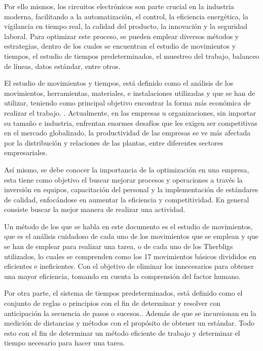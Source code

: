     
    Por ello mismos, los circuitos electrónicos son parte crucial en la industria moderna, facilitando a la automatización, el control, la eficiencia energética, la vigilancia en tiempo real, la calidad del producto, la innovación y la seguridad laboral. Para optimizar este proceso, se pueden emplear diversos métodos y estrategias, dentro de los cuales se encuentran el estudio de movimientos y tiempos, el estudio de tiempos predeterminados, el muestreo del trabajo, balanceo de líneas, datos estándar, entre otros.
    
    
    El estudio de movimientos y tiempos, está definido como el análisis de los movimientos, herramientas, materiales, e instalaciones utilizadas y que se han de utilizar, teniendo como principal objetivo encontrar la forma más económica de realizar el trabajo. \cite{RAE}. Actualmente, en las empresas u organizaciones, sin importar su tamaño e industria, enfrentan enormes desafíos que les exigen ser competitivas en el mercado globalizado, la productividad de las empresas se ve más afectada por la distribución y relaciones de las plantas, entre diferentes sectores empresariales.
    
    
    Así mismo, se debe conocer la importancia de la optimización en una empresa, esta tiene como objetivo el buscar mejorar procesos y operaciones a través la inversión en equipos, capacitación del personal y la implementación de estándares de calidad, enfocándose en aumentar la eficiencia y competitividad. En general consiste buscar la mejor manera de realizar una actividad. \cite{RAE}
    
    
    Un método de los que se habla en este documento es el estudio de movimientos, que es el análisis cuidadoso de cada uno de los movimientos que se emplean y que se han de emplear para realizar una tarea, o de cada uno de los Therbligs utilizados, lo cuales se comprenden como los 17 movimientos básicos divididos en eficientes e ineficientes. Con el objetivo de eliminar los innecesarios para obtener una mayor eficiencia, tomando en cuenta la comprensión del factor humano. \cite{niebel1980ingenieria} 
    
    
    
    Por otra parte, el sistema de tiempos predeterminados, está definido como el conjunto de reglas o principios con el fin de determinar y resolver con anticipación la secuencia de pasos o sucesos.\cite{RAE}. Además de que se incursionan en la medición de distancias y métodos con el propósito de obtener un estándar. Todo esto con el fin de determinar un método eficiente de trabajo y determinar el tiempo necesario para hacer una tarea. 
    
